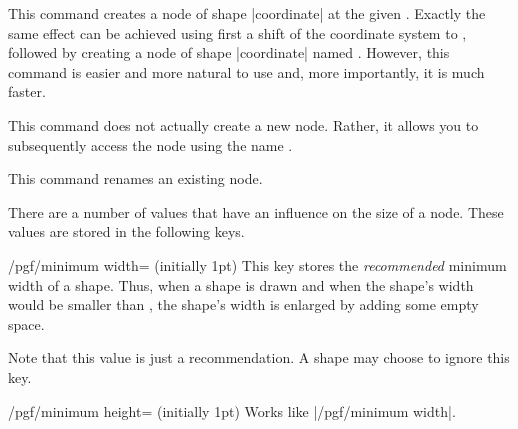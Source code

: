 \begin{command}{\pgfcoordinate{}}
    This command creates a node of shape |coordinate| at the given
    . Exactly the same effect can be achieved using first a
    shift of the coordinate system to , followed by creating a
    node of shape |coordinate| named . However, this command is
    easier and more natural to use and, more importantly, it is much faster.
\end{command}

\begin{command}{\pgfnodealias{}}
    This command does not actually create a new node. Rather, it allows you to
    subsequently access the node  using the name .
\end{command}

\begin{command}{\pgfnoderename{}}
    This command renames an existing node.
\end{command}

There are a number of values that have an influence on the size of a node.
These values are stored in the following keys.

\begin{key}{/pgf/minimum width= (initially 1pt)}
    This key stores the \emph{recommended} minimum width of a shape. Thus, when
    a shape is drawn and when the shape's width would be smaller than
    , the shape's width is enlarged by adding some empty space.

    Note that this value is just a recommendation. A shape may choose to ignore
    this key.
\begin{codeexample}[]
\end{codeexample}
\end{key}

\begin{key}{/pgf/minimum height= (initially 1pt)}
    Works like |/pgf/minimum width|.
\end{key}

